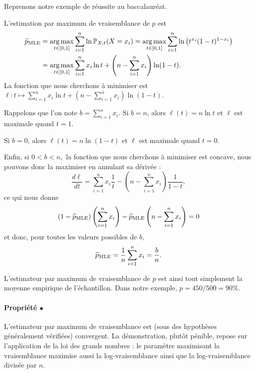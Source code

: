 \begin{exemple}
  Reprenons notre exemple de réussite au baccalauréat.
  
  L'estimation par maximum de vraisemblance de $p$ est
  \begin{align*}
    \widehat{p}_{\text{MLE}} & = \operatorname*{arg\,max}_{t \in [0, 1]} \sum_{i=1}^n \ln \mathbb{P}_{X; t}(X=x_i)
                          = \operatorname*{arg\,max}_{t \in [0, 1]} \sum_{i=1}^n \ln 
                          \left( t^{x_i} (1-t)^{1-x_i}  \right) \\
                        & = \operatorname*{arg\,max}_{t \in [0, 1]} \sum_{i=1}^n x_i \ln t + 
                          \left( n - \sum_{i=1}^n x_i \right) \ln (1-t).
  \end{align*}
  La fonction que nous cherchons à minimiser est
  $\ell: t \mapsto \sum_{i=1}^n x_i \ln t + \left( n - \sum_{i=1}^n x_i \right)
  \ln (1-t).$

  Rappelons que l'on note $b = \sum_{i=1}^n x_i.$ Si $b=n$, alors
  $\ell(t) = n \ln t$ et $\ell$ est maximale quand $t=1.$

  Si $b=0$, alors $\ell(t) = n \ln (1-t)$ et $\ell$ est maximale quand $t=0.$

  Enfin, si $0 < b < n,$ la fonction que nous cherchons à minimiser est
  concave, nous pouvons donc la maximiser en annulant sa dérivée :
  \begin{equation*}
    \frac{d \ell}{d t} = \sum_{i=1}^n x_i \frac1t - 
    \left( n - \sum_{i=1}^n x_i \right) \frac1{1-t},
  \end{equation*}
  ce qui nous donne
  \begin{equation*}
    (1 - \widehat{p}_{\text{MLE}}) \left( \sum_{i=1}^n x_i \right) - \widehat{p}_{\text{MLE}} \left( n - 
      \sum_{i=1}^n x_i \right) = 0
  \end{equation*}
  et donc, pour toutes les valeurs possibles de $b,$
  \begin{equation}
    \label{eq:mle_bernoulli}
    \widehat{p}_{\text{MLE}} = \frac{1}{n} \sum_{i=1}^n x_i = \frac{b}{n}.
  \end{equation}
  
  L'estimateur par maximum de vraisemblance de $p$ est ainsi tout simplement la
  moyenne empirique de l'échantillon. Dans notre exemple, $p=450/500=90\%.$
\end{exemple}


\paragraph{Propriété $\bullet$} L'estimateur par maximum de vraisemblance est
(sous des hypothèses généralement vérifiées) convergent. La démonstration,
plutôt pénible, repose sur l'application de la loi des grands nombres : le
paramètre maximisant la vraisemblance maximise aussi la log-vraisemblance ainsi
que la log-vraisemblance divisée par $n$.

